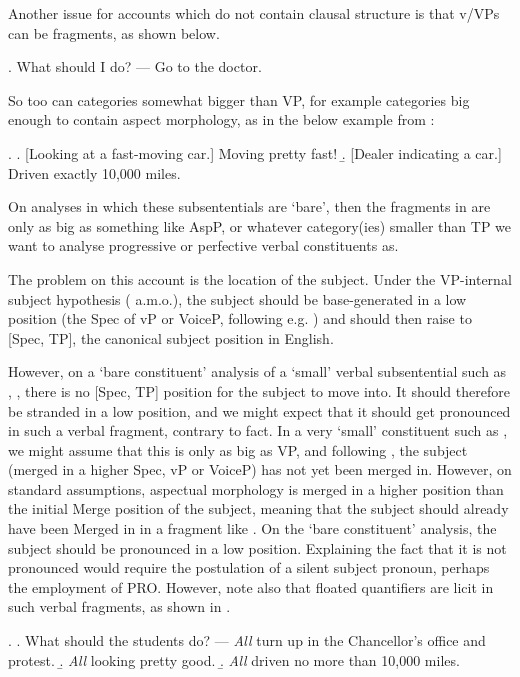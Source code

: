 \documentclass[doublespace]{umthesis}
\begin{document}
Another issue for accounts which do not contain clausal structure is that v/VPs can be fragments, as shown below.

\ex. 	What should I do? --- Go to the doctor.

So too can categories somewhat bigger than VP, for example categories big enough to contain aspect morphology, as in the below example from \cite{St06book}: 

\ex. 	\a. [Looking at a fast-moving car.] Moving pretty fast!
	\b. [Dealer indicating a car.] Driven exactly 10,000 miles.

On analyses in which these subsententials are `bare', then the fragments in \Last are only as big as something like AspP, or whatever category(ies) smaller than TP we want to analyse progressive or perfective verbal constituents as.

The problem on this account is the location of the subject. Under the VP-internal subject hypothesis (\cite{KS91} a.m.o.), the subject should be base-generated in a low position (the Spec of vP or VoiceP, following e.g. \cite{Kr96}) and should then raise to [Spec, TP], the canonical subject position in English.

However, on a `bare constituent' analysis of a `small' verbal subsentential such as \LLast, \Last, there is no [Spec, TP] position for the subject to move into. It should therefore be stranded in a low position, and we might expect that it should get pronounced in such a verbal fragment, contrary to fact. In a very `small' constituent such as \LLast, we might assume that this is only as big as VP, and following \cite{Kr96}, the subject (merged in a higher Spec, vP or VoiceP) has not yet been merged in. However, on standard assumptions,  aspectual morphology is merged in a higher position than the initial Merge position of the subject, meaning that the subject should already have been Merged in in a fragment like \Last. On the `bare constituent' analysis, the subject should be pronounced in a low position. Explaining the fact that it is not pronounced would require the postulation of a silent subject pronoun, perhaps the employment of PRO. However, note also that floated quantifiers are licit in such verbal fragments, as shown in \Next.

\ex. 	\a. What should the students do? --- \emph{All} turn up in the Chancellor's office and protest.
	\b. \emph{All} looking pretty good.
	\b. \emph{All} driven no more than 10,000 miles.
	
\end{document}
